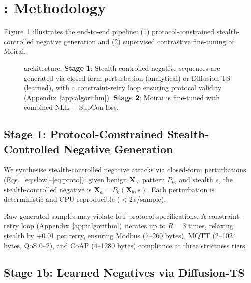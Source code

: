 \section{\ours{}: Methodology}
\label{sec:method}

Figure~\ref{fig:architecture} illustrates the end-to-end \ours{} pipeline:
(1) protocol-constrained stealth-controlled negative generation and
(2) supervised contrastive fine-tuning of Moirai.

\begin{figure}[t]
  \centering
  \resizebox{\textwidth}{!}{}
  \caption{
    \ours{} architecture.
    \textbf{Stage 1}: Stealth-controlled negative sequences are generated via closed-form
    perturbation (analytical) or Diffusion-TS (learned), with a
    constraint-retry loop ensuring protocol validity
    (Appendix~\ref{app:algorithm}).
    \textbf{Stage 2}: Moirai is fine-tuned with combined NLL + SupCon loss.
  }
  \label{fig:architecture}
\end{figure}

\subsection{Stage 1: Protocol-Constrained Stealth-Controlled Negative Generation}
\label{sec:method:gen}

We synthesise stealth-controlled negative attacks via closed-form perturbations
(Eqs.~\ref{eq:slow}--\ref{eq:proto}): given benign $\mathbf{X}_b$,
pattern $P_k$, and stealth $s$, the stealth-controlled negative is
$\mathbf{X}_a = P_k(\mathbf{X}_b, s)$.
Each perturbation is deterministic and CPU-reproducible ($<$2\,s/sample).

Raw generated samples may violate IoT protocol specifications.
A constraint-retry loop (Appendix~\ref{app:algorithm})
iterates up to $R{=}3$ times, relaxing
stealth by $+$0.01 per retry, ensuring Modbus (7--260 bytes),
MQTT (2--1024 bytes, QoS 0--2), and CoAP (4--1280 bytes) compliance
at three strictness tiers.

\subsection{Stage 1b: Learned Negatives via Diffusion-TS}
\label{sec:method:diffts}

